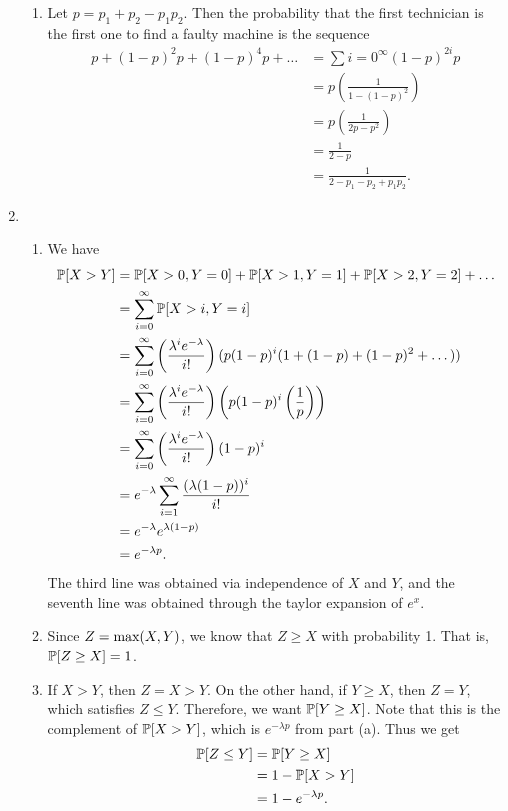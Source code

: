 \begin{enumerate}
\begin{enumerate}
        \item Let $p = p_1 + p_2 - p_1p_2$. Then the probability that the first technician is the first one to find a faulty machine is the sequence
        \begin{align*}
            p + (1 - p)^2p + (1 - p)^4p + \dots &= \sum\limits{i = 0}^\infty(1 - p)^{2i}p \\
                &= p\left(\frac{1}{1 - (1 - p)^2}\right) \\
                &= p\left(\frac{1}{2p - p^2}\right) \\
                &= \frac{1}{2 - p} \\
                &= \frac{1}{2 - p_1 - p_2 + p_1p_2}.
        \end{align*}
    \end{enumerate}
    
    \item \begin{enumerate}
        \item We have
        \begin{align*}
            \P[X > Y] &= \P[X > 0, Y = 0] + \P[X > 1, Y = 1] + \P[X > 2, Y = 2] + \dots \\
                &= \sum\limits_{i = 0}^\infty\P[X > i, Y = i] \\
                &= \sum\limits_{i = 0}^\infty\left(\frac{\lambda^ie^{-\lambda}}{i!}\right)(p(1-p)^i(1 + (1-p) + (1-p)^2 + \dots)) \\
                &= \sum\limits_{i = 0}^\infty\left(\frac{\lambda^ie^{-\lambda}}{i!}\right)\left(p(1-p)^i\left(\frac{1}{p}\right)\right) \\
                &= \sum\limits_{i = 0}^\infty\left(\frac{\lambda^ie^{-\lambda}}{i!}\right)(1-p)^i \\
                &= e^{-\lambda}\sum\limits_{i = 1}^\infty\frac{(\lambda(1 - p))^i}{i!} \\
                &= e^{-\lambda}e^{\lambda(1 - p)} \\
                &= e^{-\lambda p}.
        \end{align*}
        The third line was obtained via independence of $X$ and $Y$, and the seventh line was obtained through the taylor expansion of $e^x$.
        
        \item Since $Z = \f{max}(X, Y)$, we know that $Z \geq X$ with probability 1. That is, $\P[Z \geq X] = 1$.
        
        \item If $X > Y$, then $Z = X > Y$. On the other hand, if $Y \geq X$, then $Z = Y$, which satisfies $Z \leq Y$. Therefore, we want $\P[Y \geq X]$. Note that this is the complement of $\P[X > Y]$, which is $e^{-\lambda p}$ from part (a). Thus we get
        \begin{align*}
            \P[Z \leq Y] &= \P[Y \geq X] \\
                &= 1 - \P[X > Y] \\
                &= 1 - e^{-\lambda p}.
        \end{align*}
    \end{enumerate}
    

\end{enumerate}
